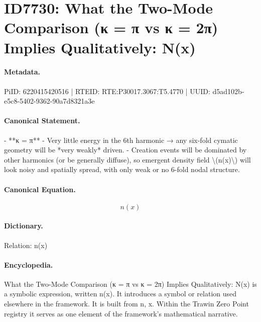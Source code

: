 \section*{ID7730: What the Two-Mode Comparison (κ = π vs κ = 2π) Implies Qualitatively: N(x)}
\paragraph{Metadata.}
PiID: 6220415420516 | RTEID: RTE:P30017.3067:T5.4770 | UUID: d5ad102b-e5c8-5402-9362-90a7d8321a3e

\paragraph{Canonical Statement.}
- **κ = π** - Very little energy in the 6th harmonic → any six-fold cymatic geometry will be *very weakly* driven. - Creation events will be dominated by other harmonics (or be generally diffuse), so emergent density field \textbackslash{}(n(x)\textbackslash{}) will look noisy and spatially spread, with only weak or no 6-fold nodal structure.

\paragraph{Canonical Equation.}
\[
n(x)
\]

\paragraph{Dictionary.}
Relation: n(x)

\paragraph{Encyclopedia.}
What the Two-Mode Comparison (κ = π vs κ = 2π) Implies Qualitatively: N(x) is a symbolic expression, written n(x). It introduces a symbol or relation used elsewhere in the framework. It is built from n, x. Within the Trawin Zero Point registry it serves as one element of the framework's mathematical narrative.
